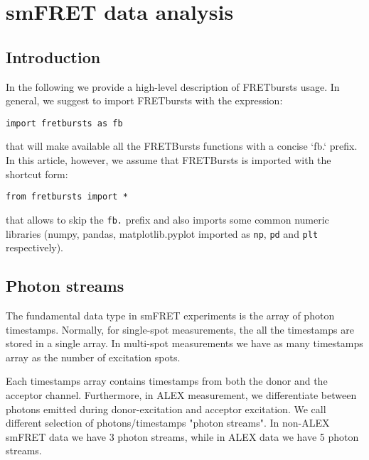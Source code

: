 \section{smFRET data analysis}

\subsection{Introduction}

In the following we provide a high-level description of FRETbursts usage. In general, we suggest to import FRETbursts with the expression:

\verb|import fretbursts as fb|

that will make available all the FRETBursts functions with a concise `fb.` prefix. In this article, however, we assume that FRETBursts is imported with the shortcut form:

\verb|from fretbursts import *|

that allows to skip the \verb|fb.| prefix and also imports some common numeric libraries (numpy, pandas, matplotlib.pyplot imported as \verb|np|, \verb|pd| and \verb|plt| respectively).

\subsection{Photon streams}

The fundamental data type in smFRET experiments is the array of photon timestamps. Normally, for single-spot measurements, the all the timestamps are stored in a single array. In multi-spot measurements we have as many timestamps array as the number of excitation spots.

Each timestamps array contains timestamps from both the donor and the acceptor channel. Furthermore, in ALEX measurement, we differentiate between photons emitted during donor-excitation and acceptor excitation. We call different selection of photons/timestamps "photon streams". In non-ALEX smFRET data we have 3 photon streams, while in ALEX data we have 5 photon streams.